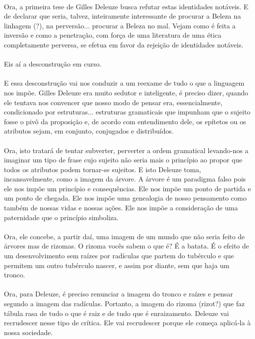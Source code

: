 \documentclass[10pt,a4paper]{book}
\begin{document}
	\\
	Ora, a primeira tese de Gilles Deleuze busca refutar estas identidades notáveis. E de declarar que seria, talvez, inteiramente interessante de procurar a Beleza na linhagem (?), na perversão... procurar a Beleza no mal. Vejam como é feita a inversão e como a penetração, com força de uma literatura de uma ética completamente perversa, se efetua em favor da rejeição de identidades notáveis.\\
	\\
	Eis aí a desconstrução em curso.\\
	\\
	E essa desconstrução vai nos conduzir a um reexame de tudo o que a linguagem nos impõe. Gilles Deleuze era muito sedutor e inteligente, é preciso dizer, quando ele tentava nos convencer que nosso modo de pensar era, essencialmente, condicionado por estruturas...  estruturas gramaticais que impunham que o sujeito fosse o pivô da proposição e, de acordo com entendimento dele, os epítetos ou os atributos sejam, em conjunto, conjugados e distribuídos.\\
	\\
	Ora, isto tratará de tentar subverter, perverter a ordem gramatical levando-nos a imaginar um tipo de frase cujo sujeito não seria mais o princípio ao propor que todos os atributos podem  tornar-se sujeitos. E isto Deleuze toma, incansavelmente, como a imagem da árvore. A árvore é um paradigma falso pois ele nos impõe um princípio e consequências. Ele nos impõe um ponto de partida e um ponto de chegada. Ele nos impõe uma genealogia de nosso pensamento como também de nossas vidas e nossas ações. Ele nos impõe a consideração de uma paternidade que o princípio simboliza.\\
	\\
	Ora, ele concebe, a partir daí, uma imagem de um mundo que não seria feito de árvores mas de rizomas. O rizoma vocês sabem o que é? É a batata. É o efeito de um desenvolvimento sem raízes por radículas que partem do tubérculo e que permitem um outro tubérculo nascer, e assim por diante, sem que haja um tronco.\\
	\\
	Ora, para Deleuze, é preciso renunciar a imagem do tronco e raízes e pensar segundo a imagem das radículas. Portanto, a imagem do rizoma (rizot?) que faz tábula rasa de tudo o que é raiz e de tudo que é enraizamento. Deleuze vai recrudescer nesse tipo de crítica. Ele vai recrudescer porque ele começa aplicá-la à nossa sociedade.\\
\end{document}
